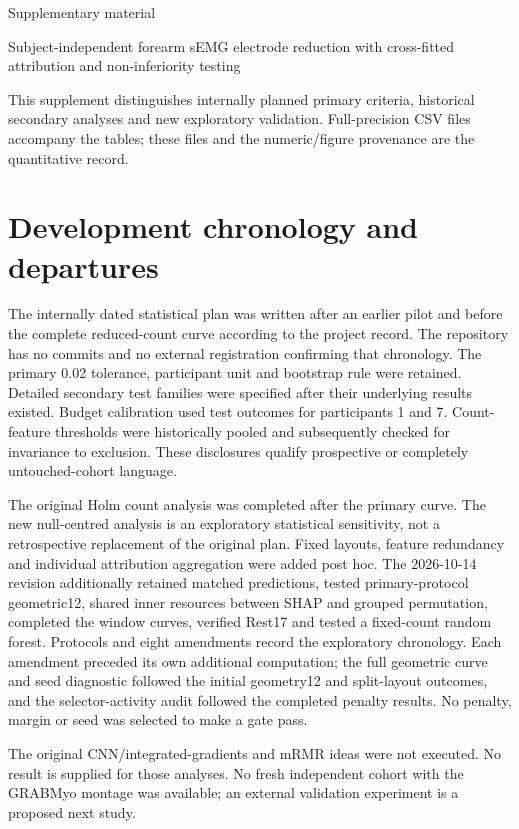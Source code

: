 \documentclass{iopjournal}
\begin{document}
{\noindent\fontsize{16}{19}\selectfont\sffamily Supplementary material\par}
\medskip
{\noindent\large Subject-independent forearm sEMG electrode reduction with cross-fitted attribution and non-inferiority testing\par}
\medskip
This supplement distinguishes internally planned primary criteria, historical secondary analyses and new exploratory validation. Full-precision CSV files accompany the tables; these files and the numeric/figure provenance are the quantitative record.

\section{Development chronology and departures}
The internally dated statistical plan was written after an earlier pilot and before the complete reduced-count curve according to the project record. The repository has no commits and no external registration confirming that chronology. The primary 0.02 tolerance, participant unit and bootstrap rule were retained. Detailed secondary test families were specified after their underlying results existed. Budget calibration used test outcomes for participants 1 and 7. Count-feature thresholds were historically pooled and subsequently checked for invariance to exclusion. These disclosures qualify prospective or completely untouched-cohort language.

The original Holm count analysis was completed after the primary curve. The new null-centred analysis is an exploratory statistical sensitivity, not a retrospective replacement of the original plan. Fixed layouts, feature redundancy and individual attribution aggregation were added post hoc. The 2026-10-14 revision additionally retained matched predictions, tested primary-protocol geometric12, shared inner resources between SHAP and grouped permutation, completed the window curves, verified Rest17 and tested a fixed-count random forest. Protocols and eight amendments record the exploratory chronology. Each amendment preceded its own additional computation; the full geometric curve and seed diagnostic followed the initial geometry12 and split-layout outcomes, and the selector-activity audit followed the completed penalty results. No penalty, margin or seed was selected to make a gate pass.

The original CNN/integrated-gradients and mRMR ideas were not executed. No result is supplied for those analyses. No fresh independent cohort with the GRABMyo montage was available; an external validation experiment is a proposed next study.
\end{document}
